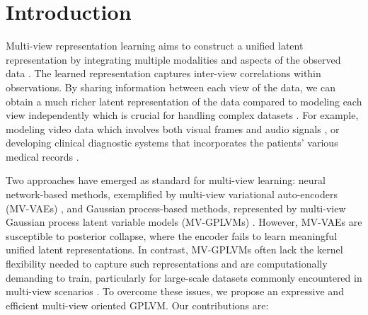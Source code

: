 \vspace{-0.08in}
\section{Introduction}
\label{sec:introduction}
\vspace{-0.05in}

Multi-view representation learning 
aims to construct a unified latent representation by integrating multiple modalities and aspects of the observed data  \citep{li2018survey, wang2015deep}. The learned representation captures %
inter-view correlations within observations. By sharing information between each view of the data, we can obtain a much richer latent representation of the data compared to modeling each view independently which is crucial for
handling complex datasets \citep{zhang2018generalized, wei2022self, lu2019see}. For example, modeling video data which involves both visual frames and audio signals  \citep{hussain2021comprehensive}, or developing clinical diagnostic systems that incorporates the patients' various medical records \citep{yuan2018multi}. %

Two approaches have emerged as standard for multi-view learning: neural network-based methods, exemplified by multi-view variational auto-encoders (MV-VAEs) \citep{wu2018multimodal, mao2023multimodal}, and Gaussian process-based methods, represented by multi-view Gaussian process latent variable models (MV-GPLVMs) \citep{li2017shared, sun2020multi}. However, MV-VAEs are susceptible to posterior collapse, where the encoder fails to learn meaningful unified latent representations. In contrast, MV-GPLVMs often lack the kernel flexibility needed to capture such representations \citep{li2017shared} and are computationally demanding to train, particularly for large-scale datasets commonly encountered in multi-view scenarios \citep{sun2020multi}. To overcome these issues, we propose an expressive and efficient multi-view oriented GPLVM. Our contributions are:

